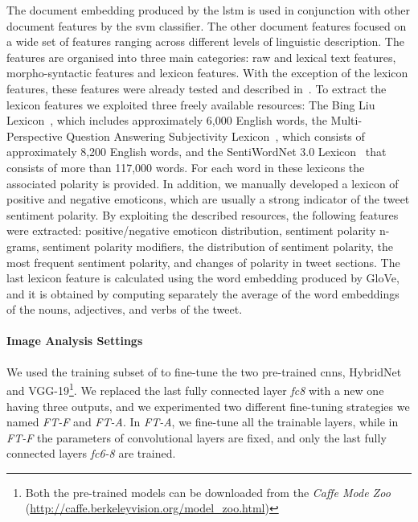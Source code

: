 The document embedding produced by the \gls{lstm} is used in conjunction with other document features by the \gls{svm} classifier.
The other document features focused on a wide set of features ranging across different levels of linguistic description.
The features are organised into three main  categories: raw  and  lexical  text  features, morpho-syntactic features and lexicon features.
With the exception of the lexicon features, these features were already tested and described in~\cite{cimino2016tandem}.
To extract the lexicon features we exploited three freely available resources: The Bing Liu Lexicon~\cite{hu2004mining}, which includes approximately 6,000 English words, the Multi-Perspective Question Answering Subjectivity Lexicon~\cite{wilson2005recognizing}, which consists of approximately 8,200 English words, and the SentiWordNet 3.0 Lexicon~\cite{baccianella2010sentiwordnet} that consists of more than 117,000 words.
For each word in these lexicons the associated polarity is provided.
In addition, we manually developed a lexicon of positive and negative emoticons, which are usually a strong indicator of the tweet sentiment polarity.
By exploiting the described resources, the following features were extracted: positive/negative emoticon distribution, sentiment polarity n-grams, sentiment polarity modifiers, the distribution of sentiment polarity, the most frequent sentiment polarity, and changes of polarity in tweet sections.
The last lexicon feature is calculated using the word embedding produced by GloVe, and it is obtained by computing separately the average of the word embeddings of the nouns, adjectives, and verbs of the tweet.

\paragraph{Image Analysis Settings}
We used the training subset of \BTSA{} to fine-tune the two pre-trained \glspl{cnn}, HybridNet and VGG-19\footnote{Both the pre-trained models can be downloaded from the \emph{Caffe Mode Zoo} (\url{http://caffe.berkeleyvision.org/model_zoo.html})}.
We replaced the last fully connected layer \emph{fc8} with a new one having three outputs, and we experimented two different fine-tuning strategies we named \emph{FT-F} and \emph{FT-A}.
In \emph{FT-A}, we fine-tune all the trainable layers, while in \emph{FT-F} the parameters of convolutional layers are fixed, and only the last fully connected layers \emph{fc6-8} are trained.

